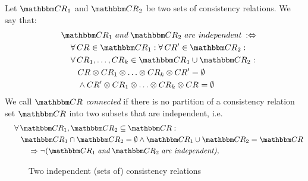 \begin{definition}
    \label{def:independence}
    Let $\consistencyrelationset{CR}_{1}$ and $\consistencyrelationset{CR}_{2}$ be two sets of consistency relations. We say that:
    \begin{align*}
        \formulaskip &
        \consistencyrelationset{CR}_{1} \mathtext{and} \consistencyrelationset{CR}_{2} \mathtext{are independent} \equivalentperdefinition \\
        & \formulaskip
        \forall \consistencyrelation{CR}{} \in \consistencyrelationset{CR}_{1} : \forall \consistencyrelation{CR'}{} \in \consistencyrelationset{CR}_{2} : \\
        & \formulaskip 
        \forall \consistencyrelation{CR}{1}, \dots, \consistencyrelation{CR}{k} \in \consistencyrelationset{CR}_{1} \cup \consistencyrelationset{CR}_{2} : \\
        & \formulaskip\formulaskip
        \consistencyrelation{CR}{} \concat \consistencyrelation{CR}{1} \concat \dots \concat \consistencyrelation{CR}{k} \concat \consistencyrelation{CR'}{} = \emptyset \\
        & \formulaskip\formulaskip
        \land \consistencyrelation{CR'}{} \concat \consistencyrelation{CR}{1} \concat \dots \concat \consistencyrelation{CR}{k} \concat \consistencyrelation{CR}{} = \emptyset
    \end{align*}
    We call $\consistencyrelationset{CR}$ \emph{connected} if there is no partition of a consistency relation set $\consistencyrelationset{CR}$ into two subsets that are independent, i.e.
    \begin{align*}
        \formulaskip &
        \forall \consistencyrelationset{CR}_{1}, \consistencyrelationset{CR}_{2} \subseteq \consistencyrelationset{CR} : \\
        & \formulaskip 
        \consistencyrelationset{CR}_{1} \cap \consistencyrelationset{CR}_{2} = \emptyset \land \consistencyrelationset{CR}_{1} \cup \consistencyrelationset{CR}_{2} = \consistencyrelationset{CR}  \\
        & \formulaskip\formulaskip
        \Rightarrow \neg (\consistencyrelationset{CR}_{1} \mathtext{and} \consistencyrelationset{CR}_{2} \mathtext{are independent),}
    \end{align*}
\end{definition}

\begin{figure}
    \centering
    
    \caption{Two independent (sets of) consistency relations}
    \label{fig:correctness:formal:independence_example}
\end{figure}

